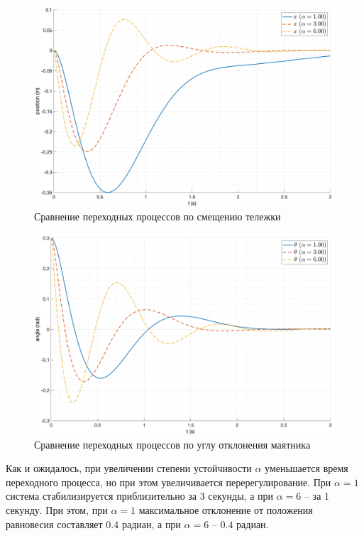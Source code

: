 \begin{figure}[ht!]
    \centering
    \includegraphics[width=\textwidth]{media/plots/nonmodal_controllers/x_cmp.png}
    \caption{Сравнение переходных процессов по смещению тележки}
    \label{fig:nonmodal_control_cmp_x}
\end{figure}
\begin{figure}[ht!]
    \centering
    \includegraphics[width=\textwidth]{media/plots/nonmodal_controllers/ang_cmp.png}
    \caption{Сравнение переходных процессов по углу отклонения маятника}
    \label{fig:nonmodal_control_cmp_ang}
\end{figure}

\FloatBarrier
Как и ожидалось, при увеличении степени устойчивости $\alpha$ уменьшается время переходного процесса, но при этом 
увеличивается перерегулирование. При $\alpha = 1$ система стабилизируется приблизительно за $3$ секунды, а 
при $\alpha = 6$ -- за $1$ секунду. При этом, при $\alpha = 1$ максимальное отклонение от положения равновесия составляет 
$0.4$ радиан, а при $\alpha = 6$ -- $0.4$ радиан. 

